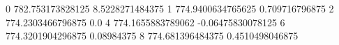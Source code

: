 0 782.753173828125 8.5228271484375
1 774.9400634765625 0.709716796875
2 774.2303466796875 0.0
4 774.1655883789062 -0.06475830078125
6 774.3201904296875 0.08984375
8 774.681396484375 0.4510498046875
